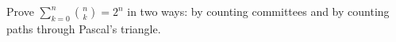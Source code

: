 Prove $\sum_{k=0}^n\binom nk=2^n$ in two ways: by counting committees and by counting paths through Pascal's triangle.
